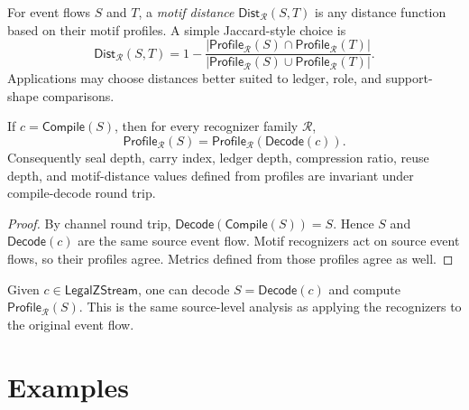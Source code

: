 \begin{definition}
\label{def:motif-generated-distance}
For event flows $S$ and $T$, a \emph{motif distance} $\mathsf{Dist}_{\mathcal R}(S,T)$ is any distance function based on their motif profiles. A simple Jaccard-style choice is
$$
  \mathsf{Dist}_{\mathcal R}(S,T)
  =
  1-
  \frac{
    |\mathsf{Profile}_{\mathcal R}(S)\cap\mathsf{Profile}_{\mathcal R}(T)|
  }{
    |\mathsf{Profile}_{\mathcal R}(S)\cup\mathsf{Profile}_{\mathcal R}(T)|
  }.
$$
Applications may choose distances better suited to ledger, role, and support-shape comparisons.
\end{definition}

\begin{theorem}
\label{thm:motif-generated-metrics-roundtrip-invariant}
If $c=\mathsf{Compile}(S)$, then for every recognizer family $\mathcal R$,
$$
  \mathsf{Profile}_{\mathcal R}(S)
  =
  \mathsf{Profile}_{\mathcal R}(\mathsf{Decode}(c)).
$$
Consequently seal depth, carry index, ledger depth, compression ratio, reuse depth, and motif-distance values defined from profiles are invariant under compile-decode round trip.
\end{theorem}

\begin{proof}
By channel round trip, $\mathsf{Decode}(\mathsf{Compile}(S))=S$. Hence $S$ and $\mathsf{Decode}(c)$ are the same source event flow. Motif recognizers act on source event flows, so their profiles agree. Metrics defined from those profiles agree as well.
\end{proof}

\begin{corollary}
\label{cor:motif-generated-analysis-on-decoded-code}
Given $c\in\mathsf{LegalZStream}$, one can decode $S=\mathsf{Decode}(c)$ and compute $\mathsf{Profile}_{\mathcal R}(S)$. This is the same source-level analysis as applying the recognizers to the original event flow.
\end{corollary}

\section{Examples}
\label{sec:motif-generated-examples}

